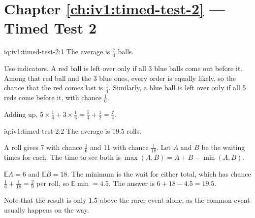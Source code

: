\section*{Chapter \ref{ch:iv1:timed-test-2} --- Timed Test 2}

\begin{solution}{iq:iv1:timed-test-2:1}
The average is $\frac74$ balls.

Use indicators. A red ball is left over only if all 3 blue balls come out before it. Among that red ball and the 3 blue ones, every order is equally likely, so the chance that the red comes last is $\frac14$. Similarly, a blue ball is left over only if all 5 reds come before it, with chance $\frac16$.

Adding up, $5 \times \frac14 + 3 \times \frac16 = \frac54 + \frac12 = \frac74$.

\end{solution}

\begin{solution}{iq:iv1:timed-test-2:2}
The average is $19.5$ rolls.

A roll gives 7 with chance $\frac16$ and 11 with chance $\frac{1}{18}$. Let $A$ and $B$ be the waiting times for each. The time to see both is $\max(A, B) = A + B - \min(A, B)$.

$\mathbb{E}A = 6$ and $\mathbb{E}B = 18$. The minimum is the wait for either total, which has chance $\frac16 + \frac{1}{18} = \frac29$ per roll, so $\mathbb{E}\min = 4.5$. The answer is $6 + 18 - 4.5 = 19.5$.

Note that the result is only $1.5$ above the rarer event alone, as the common event usually happens on the way.

\end{solution}

